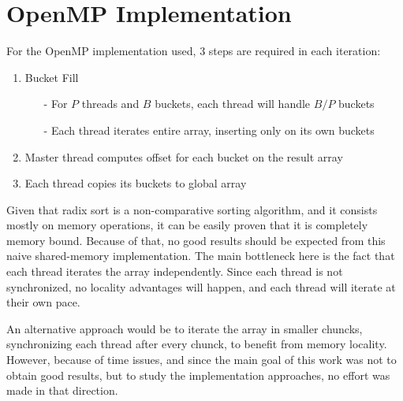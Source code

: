 \section{OpenMP Implementation}
\label{sec:400}

For the OpenMP implementation used, 3 steps are required in each iteration:

\begin{enumerate}
	\item Bucket Fill
	\begin{itemize}
		\item[-] For $P$ threads and $B$ buckets, each thread will handle $B/P$ buckets
		\item[-] Each thread iterates entire array, inserting only on its own buckets
	\end{itemize}

	\item Master thread computes offset for each bucket on the result array

	\item Each thread copies its buckets to global array
\end{enumerate}

Given that radix sort is a non-comparative sorting algorithm, and it consists mostly on memory operations, it can be easily proven that it is completely memory bound. Because of that, no good results should be expected from this naive shared-memory implementation. The main bottleneck here is the fact that each thread iterates the array independently. Since each thread is not synchronized, no locality advantages will happen, and each thread will iterate at their own pace.

An alternative approach would be to iterate the array in smaller chuncks, synchronizing each thread after every chunck, to benefit from memory locality. However, because of time issues, and since the main goal of this work was not to obtain good results, but to study the implementation approaches, no effort was made in that direction.
